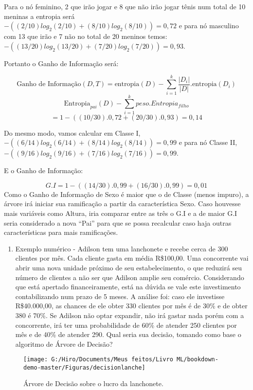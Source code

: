 \documentclass[
  openany]{book}
\providecommand{\tightlist}{%
  \setlength{\itemsep}{0pt}\setlength{\parskip}{0pt}}
\begin{document}
Para o nó feminino, 2 que irão jogar e 8 que não irão jogar tênis num total de 10 meninas a entropia será \(- ((2/10) log_2 (2/10) + (8/10) log_2 (8/10)) = 0,72\) e para nó masculino com 13 que irão e 7 não no total de 20 meninos temos: \(- ((13/20) log_2 (13/20) + (7/20) log_2 (7/20)) = 0,93\).

Portanto o Ganho de Informação será:

\[\mbox{Ganho de Informação}(D,T)=\mbox{entropia}(D)-\displaystyle \sum_{i=1}^k \frac{|D_i|}{|D|}. \mbox{entropia}(D_i)\]
\[\mbox{Entropia}_{pai}(D)-\sum_{i=1}^k peso. Entropia_{filho}\]
\[= 1-((10/30).0,72 + (20/30). 0,93) = 0,14\]

Do mesmo modo, vamos calcular em Classe I, \(- ((6/14) log_2 (6/14) + (8/14) log_2 (8/14)) = 0,99\) e para nó Classe II, \(- ((9/16) log_2 (9/16) + (7/16) log_2 (7/16)) = 0,99\).

E o Ganho de Informação:

\[G.I = 1-((14/30) . 0,99 + (16/30) . 0,99) = 0,01\]
Como o Ganho de Informação de Sexo é maior que o de Classe (menos impuro), a árvore irá iniciar sua ramificação a partir da característica Sexo. Caso houvesse mais variáveis como Altura, iria comparar entre as três o G.I e a de maior G.I seria considerado a nova ``Pai'' para que se possa recalcular caso haja outras características para mais ramificações.

\begin{enumerate}
\def\labelenumi{\arabic{enumi}.}
\setcounter{enumi}{2}
\tightlist
\item
  Exemplo numérico - Adilson tem uma lanchonete e recebe cerca de 300 clientes por mês. Cada cliente gasta em média R\$100,00. Uma concorrente vai abrir uma nova unidade próximo de seu estabelecimento, o que reduzirá seu número de clientes a não ser que Adilson amplie seu comércio. Considerando que está apertado financeiramente, está na dúvida se vale este investimento contabilizando num prazo de 5 meses. A análise foi: caso ele investisse R\$40.000,00, as chances de ele obter 330 clientes por mês é de 30\% e de obter 380 é 70\%. Se Adilson não optar expandir, não irá gastar nada porém com a concorrente, irá ter uma probabilidade de 60\% de atender 250 clientes por mês e de 40\% de atender 290. Qual seria sua decisão, tomando como base o algoritmo de Árvore de Decisão?
\end{enumerate}

\begin{figure}

{\centering \texttt{[image: G:/Hiro/Documents/Meus feitos/Livro ML/bookdown-demo-master/Figuras/decisionlanche]} 

}

\caption{Árvore de Decisão sobre o lucro da lanchonete.}\label{fig:decisionlanche}
\end{figure}
\end{document}
